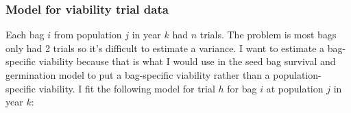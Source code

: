 \documentclass[12pt, oneside, titlepage]{article}   	%
\begin{document}

\subsubsection*{Model for viability trial data}

Each bag $i$ from population $j$ in year $k$ had $n$ trials. The problem is most bags only had 2 trials so it's difficult to estimate a variance. I want to estimate a bag-specific viability because that is what I would use in the seed bag survival and germination model to put a bag-specific viability rather than a population-specific viability. I fit the following model for trial $h$ for bag $i$ at population $j$ in year $k$:
\end{document}
